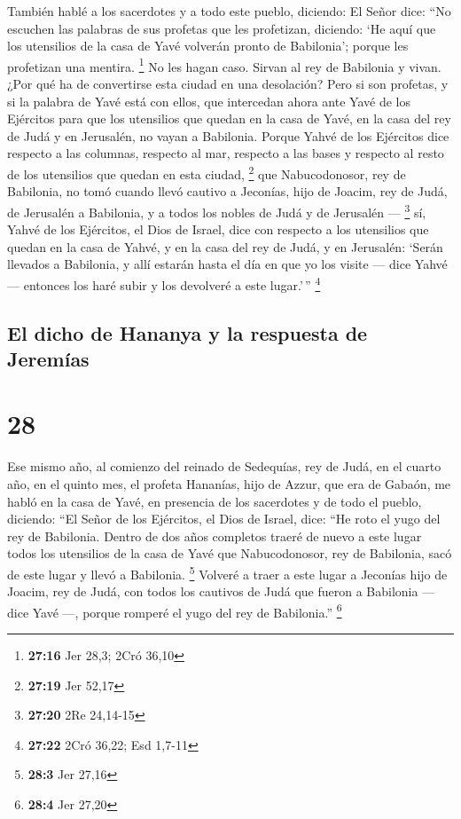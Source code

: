  También hablé a los sacerdotes y a todo este pueblo,
diciendo: El Señor dice: ``No escuchen las palabras de sus profetas que
les profetizan, diciendo: `He aquí que los utensilios de la casa de Yavé
volverán pronto de Babilonia'; porque les profetizan una mentira.
\footnote{\textbf{27:16} Jer 28,3; 2Cró 36,10}  No les
hagan caso. Sirvan al rey de Babilonia y vivan. ¿Por qué ha de
convertirse esta ciudad en una desolación?  Pero si son
profetas, y si la palabra de Yavé está con ellos, que intercedan ahora
ante Yavé de los Ejércitos para que los utensilios que quedan en la casa
de Yavé, en la casa del rey de Judá y en Jerusalén, no vayan a
Babilonia.  Porque Yahvé de los Ejércitos dice respecto a
las columnas, respecto al mar, respecto a las bases y respecto al resto
de los utensilios que quedan en esta ciudad, \footnote{\textbf{27:19}
  Jer 52,17}  que Nabucodonosor, rey de Babilonia, no
tomó cuando llevó cautivo a Jeconías, hijo de Joacim, rey de Judá, de
Jerusalén a Babilonia, y a todos los nobles de Judá y de Jerusalén ---
\footnote{\textbf{27:20} 2Re 24,14-15}  sí, Yahvé de los
Ejércitos, el Dios de Israel, dice con respecto a los utensilios que
quedan en la casa de Yahvé, y en la casa del rey de Judá, y en
Jerusalén:  `Serán llevados a Babilonia, y allí estarán
hasta el día en que yo los visite --- dice Yahvé --- entonces los haré
subir y los devolveré a este lugar.'\,'' \footnote{\textbf{27:22} 2Cró
  36,22; Esd 1,7-11}

\hypertarget{el-dicho-de-hananya-y-la-respuesta-de-jeremuxedas}{%
\subsection{El dicho de Hananya y la respuesta de
Jeremías}\label{el-dicho-de-hananya-y-la-respuesta-de-jeremuxedas}}

\hypertarget{section-27}{%
\section{28}\label{section-27}}

 Ese mismo año, al comienzo del reinado de Sedequías, rey
de Judá, en el cuarto año, en el quinto mes, el profeta Hananías, hijo
de Azzur, que era de Gabaón, me habló en la casa de Yavé, en presencia
de los sacerdotes y de todo el pueblo, diciendo:  ``El
Señor de los Ejércitos, el Dios de Israel, dice: ``He roto el yugo del
rey de Babilonia.  Dentro de dos años completos traeré de
nuevo a este lugar todos los utensilios de la casa de Yavé que
Nabucodonosor, rey de Babilonia, sacó de este lugar y llevó a Babilonia.
\footnote{\textbf{28:3} Jer 27,16}  Volveré a traer a este
lugar a Jeconías hijo de Joacim, rey de Judá, con todos los cautivos de
Judá que fueron a Babilonia --- dice Yavé ---, porque romperé el yugo
del rey de Babilonia.'' \footnote{\textbf{28:4} Jer 27,20}

